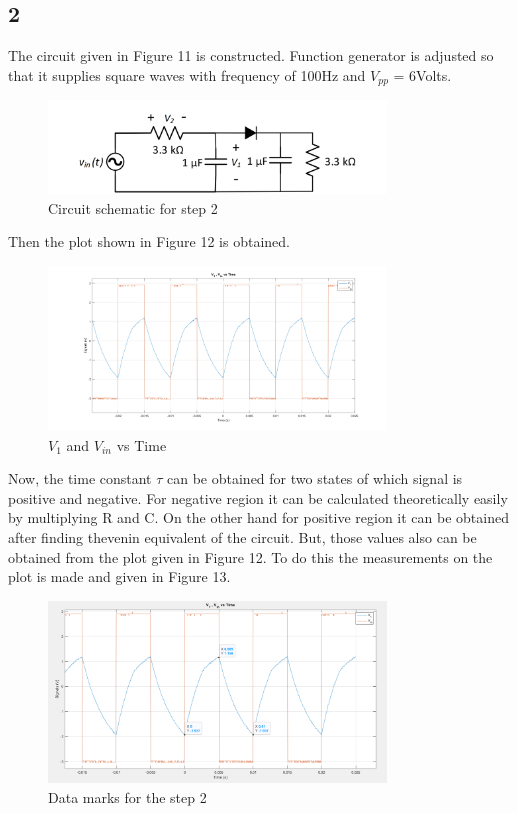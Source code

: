 \documentclass[letterpaper,12pt]{article}
\begin{document}
\subsection{2}
The circuit given in Figure 11 is constructed. Function generator is adjusted so that it supplies square waves with frequency of 100Hz and \(V_{pp}\) = 6Volts. 
\begin{figure}[H]
	\centering
   \includegraphics[width=0.8\textwidth]{2_sch.png}
   \caption{Circuit schematic for step 2}
\end{figure} 
Then the plot shown in Figure 12 is obtained.
\begin{figure}[H]
	\centering
   \includegraphics[width=0.8\textwidth]{2.png}
   \caption{\(V_1\) and \(V_{in}\) vs Time}
\end{figure} 
Now, the time constant \(\tau\) can be obtained for two states of which signal is positive and negative. For negative region it can be calculated theoretically easily by multiplying R and C. On the other hand for positive region it can be obtained after finding thevenin equivalent of the circuit. But, those values also can be obtained from the plot given in Figure 12. To do this the measurements on the plot is made and given in Figure 13.
\begin{figure}[H]
	\centering
   \includegraphics[width=0.8\textwidth]{2_plot_data.png}
   \caption{Data marks for the step 2}
\end{figure} 
\end{document}
